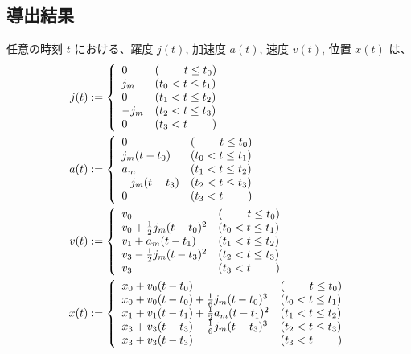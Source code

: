 \documentclass[a5paper]{ltjsarticle}
\begin{document}
\subsection{導出結果}
任意の時刻 $t$ における、躍度 $j(t)$, 加速度 $a(t)$, 速度 $v(t)$, 位置 $x(t)$
は、
\begin{align}
    j(t)
     & :=
    \left\{ \begin{array}{ll}
        0    & (\hspace{2.2em}t \le t_0) \\
        j_m  & (t_0 < t \le t_1)         \\
        0    & (t_1 < t \le t_2)         \\
        -j_m & (t_2 < t \le t_3)         \\
        0    & (t_3 < t \hspace{2.2em})
    \end{array} \right.
    \\
    a(t)
     & :=
    \left\{ \begin{array}{ll}
        0           & (\hspace{2.2em}t \le t_0) \\
        j_m(t-t_0)  & (t_0 < t \le t_1)         \\
        a_m         & (t_1 < t \le t_2)         \\
        -j_m(t-t_3) & (t_2 < t \le t_3)         \\
        0           & (t_3 < t \hspace{2.2em})
    \end{array} \right.
    \\
    v(t)
     & :=
    \left\{ \begin{array}{ll}
        v_0                           & (\hspace{2.2em} t \le t_0) \\
        v_0 + \frac{1}{2}j_m(t-t_0)^2 & (t_0 < t \le t_1)          \\
        v_1 + a_m(t-t_1)              & (t_1 < t \le t_2)          \\
        v_3 - \frac{1}{2}j_m(t-t_3)^2 & (t_2 < t \le t_3)          \\
        v_3                           & (t_3 < t \hspace{2.2em})
    \end{array} \right.
    \\
    x(t)
     & :=
    \left\{ \begin{array}{ll}
        x_0 + v_0(t-t_0)                           & (\hspace{2.2em} t \le t_0) \\
        x_0 + v_0(t-t_0) + \frac{1}{6}j_m(t-t_0)^3 & (t_0 < t \le t_1)          \\
        x_1 + v_1(t-t_1) + \frac{1}{2}a_m(t-t_1)^2 & (t_1 < t \le t_2)          \\
        x_3 + v_3(t-t_3) - \frac{1}{6}j_m(t-t_3)^3 & (t_2 < t \le t_3)          \\
        x_3 + v_3(t-t_3)                           & (t_3 < t \hspace{2.2em})
    \end{array} \right.
\end{align}
\end{document}
